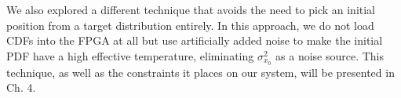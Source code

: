 \documentclass[hyperref={colorlinks=true, urlcolor=blue, citecolor=blue, final, bound}]{sfuthesis}
\newcommand{\kB}{k_{\mathrm{B}}}
\begin{document}
We also explored a different technique that avoids the need to pick an initial position from a target distribution entirely. In this approach, we do not load CDFs into the FPGA at all but use artificially added noise to make the initial PDF have a high effective temperature, eliminating $\sigma_{x_0}^2$ as a noise source. This technique, as well as the constraints it places on our system, will be presented in Ch. 4.
\end{document}
